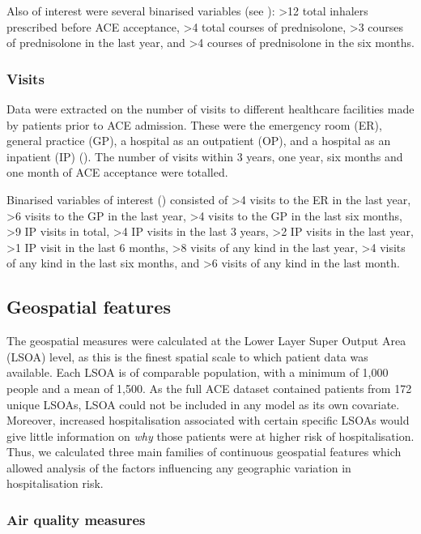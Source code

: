 Also of interest were several binarised variables (see ): \textgreater 12 total inhalers prescribed before ACE acceptance, >4 total courses of prednisolone, >3 courses of prednisolone in the last year, and >4 courses of prednisolone in the six months.

\subsubsection{Visits}
% 
Data were extracted on the number of visits to different healthcare facilities made by patients prior to ACE admission. These were the emergency room (ER), general practice (GP), a hospital as an outpatient (OP), and a hospital as an inpatient (IP) (). The number of visits within 3 years, one year, six months and one month of ACE acceptance were totalled.

Binarised variables of interest () consisted of >4 visits to the ER in the last year, >6 visits to the GP in the last year, >4 visits to the GP in the last six months, >9 IP visits in total,  >4 IP visits in the last 3 years, >2 IP visits in the last year, >1 IP visit in the last 6 months, >8 visits of any kind in the last year, >4 visits of any kind in the last six months, and >6 visits of any kind in the last month.

\subsection{Geospatial features}
\label{sec:geospatial-features}

The geospatial measures were calculated at the Lower Layer Super Output Area (LSOA) level, as this is the finest spatial scale to which patient data was available. Each LSOA is of comparable population, with a minimum of 1,000 people and a mean of 1,500. As the full ACE dataset contained patients from 172 unique LSOAs, LSOA could not be included in any model as its own covariate. Moreover, increased hospitalisation associated with certain specific LSOAs would give little information on \textit{why} those patients were at higher risk of hospitalisation. Thus, we calculated three main families of continuous geospatial features which allowed analysis of the factors influencing any geographic variation in hospitalisation risk.

\subsubsection{Air quality measures}


